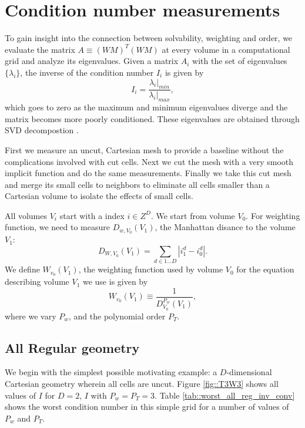\documentclass{article}
\begin{document}
\section{Condition number measurements}

To gain insight into the connection between solvability, weighting and
order, we evaluate the matrix $A \equiv (WM)^T(WM)$
at every volume in a computational grid and analyze its
eigenvalues.   Given a matrix $A_i$ with the set of eigenvalues
$\{ \lambda_{i}\}$, the inverse of the condition number $I_i$ is given by
\begin{equation*}
  I_i = \frac{\lambda_i|_{min}}{\lambda_i|_{max}},
\end{equation*}
which goes to zero as the maximum and minimum eigenvalues diverge and
the matrix becomes more poorly conditioned.   These eigenvalues are
obtained through  SVD decompostion \footnotemark[7].

First we  measure   an uncut, Cartesian mesh to
provide a baseline without the complications involved with cut cells.
Next we cut the mesh with a very smooth implicit function and do the
same measurements.   Finally we take this cut mesh and merge its small
cells to neighbors to eliminate all cells smaller than a Cartesian
volume to isolate the effects of small cells.

All volumes $V_i$ start with a index $i \in Z^D$.
We start from volume $V_0$.   For 
weighting function, we need to measure $D_{w, V_0}(V_1)$,
the Manhattan disance to the volume $V_1$:
\begin{equation}
  D_{W, V_0}(V_1) = \sum\limits_{d \in {1...D}} |i_1^d - i_0^d|.
\label{eqn::uptownFunk}
\end{equation}
We define $W_{v_0}(V_1)$, the weighting function used by volume $V_0$ for the
equation describing  volume $V_1$ we use is given by
\begin{equation}
  W_{v_0}(V_1)  \equiv \frac{1}{D^{P_w}_{V_0}(V_1)},
\label{eqn::weightFunk}  
\end{equation}
where we vary $P_w$, and the 
polynomial order $P_T$.

\subsection{All Regular geometry}

We begin with the simplest possible motivating example: a
$D$-dimensional Cartesian geometry wherein all cells are uncut.
Figure \ref{fig::T3W3} shows all values of $I$ for $D=2$, $I$ with
$P_w = P_T = 3$.  Table \ref{tab::worst_all_reg_inv_conv} shows the
worst condition number in this simple grid for a number of values of
$P_w$ and $P_T$. 
\end{document}
